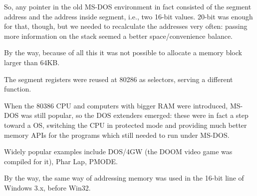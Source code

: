 So, any pointer in the old MS-DOS environment in fact consisted of the segment address and the address inside
segment, i.e., two 16-bit values. 20-bit was enough for that, though, but we needed to recalculate
the addresses very often: passing more information on the stack seemed a better space/convenience balance.

By the way, because of all this it was not possible to allocate a memory block larger than 64KB.


The segment registers were reused at 80286 as selectors, serving a different function.


When the 80386 CPU and computers with bigger \ac{RAM} were introduced,
MS-DOS was still popular, so the DOS extenders emerged: these were in fact
a step toward a  \ac{OS},
switching the CPU in protected mode and providing much better memory \ac{API}s for the programs 
which still needed to run under MS-DOS.

Widely popular examples include DOS/4GW (the DOOM video game was compiled for it), Phar Lap, PMODE.
\par
{}

By the way, the same way of addressing memory was used in the 16-bit line of Windows 3.x, before Win32.

